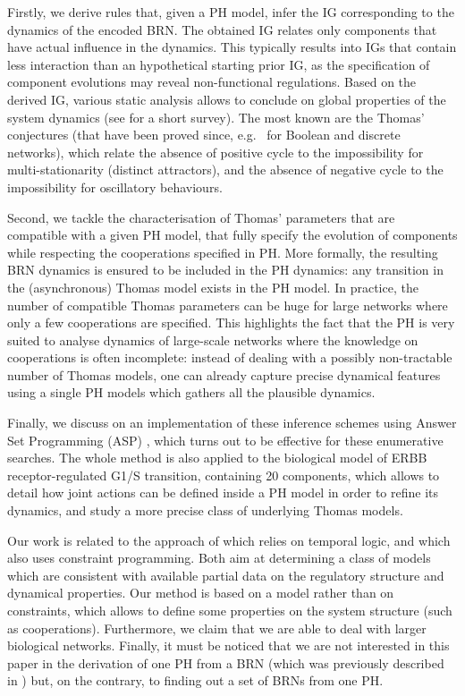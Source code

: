 Firstly, we derive rules that, given a PH model, infer the IG corresponding to the dynamics of the
encoded BRN.
The obtained IG relates only components that have actual influence in the dynamics.
This typically results into IGs that contain less interaction than an hypothetical starting prior
IG, as the specification of component evolutions may reveal non-functional regulations.
Based on the derived IG, various static analysis allows to conclude on global properties
of the system dynamics (see \cite{PR11-SASB} for a short survey).
The most known are the Thomas' conjectures (that have been proved since,
e.g.~\cite{RRT08,RiCo07,Richard2010378}
for Boolean and discrete networks),
which relate the absence of
positive cycle to the impossibility for multi-stationarity (distinct attractors),
and the absence of negative cycle to the impossibility for oscillatory behaviours.

Second, we tackle the characterisation of Thomas' parameters that are compatible with a given PH
model, \ie that fully specify the evolution of components while respecting the cooperations
specified in PH.
More formally, the resulting BRN dynamics is ensured to be included in the PH dynamics: any
transition in the (asynchronous) Thomas model exists in the PH model.
In practice, the number of compatible Thomas parameters can be huge for large networks where only a
few cooperations are specified.
This highlights the fact that the PH is very suited to analyse dynamics of large-scale networks
where the knowledge on cooperations is often incomplete:
instead of dealing with a possibly non-tractable number of Thomas models, one can already capture
precise dynamical features using a single PH models which gathers all the plausible dynamics.

Finally, we discuss on an implementation of these inference schemes using Answer Set
Programming (ASP) \cite{Baral03},  which turns out to be effective for these enumerative searches.
The whole method is also applied to the biological model of ERBB receptor-regulated G1/S transition,
containing 20 components,
which allows to detail how joint actions can be defined inside a PH model in order
to refine its dynamics, and study a more precise class of underlying Thomas models.

Our work is related to the approach of \cite{Khalis09} which relies on temporal logic, and \cite{20646302,DBLP:conf/ipcat/CorblinFTCT12} which also uses constraint programming.
Both aim at determining a class of models which are consistent with available partial data on the regulatory structure and dynamical properties.
Our method is based on a model rather than on constraints, which allows to define some properties on the system structure (such as cooperations).
Furthermore, we claim that we are able to deal with larger biological networks.
Finally, it must be noticed that we are not interested in this paper in the derivation of one PH
from a BRN (which was previously described in \cite{PMR10-TCSB}) but, on the contrary, to finding
out a set of BRNs from one PH.


